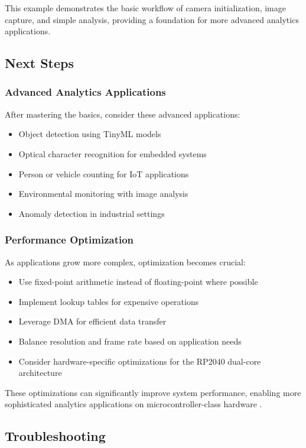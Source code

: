This example demonstrates the basic workflow of camera initialization, image capture, and simple analysis, providing a foundation for more advanced analytics applications.

\subsection{Next Steps}
\subsubsection{Advanced Analytics Applications}
After mastering the basics, consider these advanced applications:

\begin{itemize}
	\item Object detection using TinyML models \cite{Arducam:2023}
	\item Optical character recognition for embedded systems
	\item Person or vehicle counting for IoT applications
	\item Environmental monitoring with image analysis
	\item Anomaly detection in industrial settings
\end{itemize}

\subsubsection{Performance Optimization}
As applications grow more complex, optimization becomes crucial:

\begin{itemize}
	\item Use fixed-point arithmetic instead of floating-point where possible
	\item Implement lookup tables for expensive operations
	\item Leverage DMA for efficient data transfer
	\item Balance resolution and frame rate based on application needs
	\item Consider hardware-specific optimizations for the RP2040 dual-core architecture
\end{itemize}

These optimizations can significantly improve system performance, enabling more sophisticated analytics applications on microcontroller-class hardware \cite{Arducam:2023}.

\subsection{Troubleshooting}
